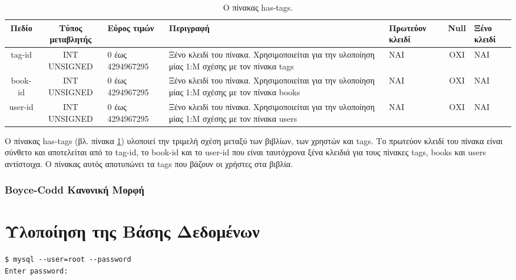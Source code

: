 \documentclass{assignment}
\begin{document}
\begin{landscape}
\begin{table}[htbp]
\begin{center}
  \begin{tabular}{|c|c|m{}|m{}|m{2.0cm}|c|m{1.5cm}|}
    \hline
    {\bf Πεδίο} & {\bf Τύπος μεταβλητής} & {\bf Εύρος τιμών} & {\bf Περιγραφή} & {\bf Πρωτεύον κλειδί} & {\bf Null} & {\bf Ξένο κλειδί} \\ \hline
    tag-id & INT UNSIGNED & 0 έως 4294967295 & Ξένο κλειδί του πίνακα. Χρησιμοποιείται για την υλοποίηση μίας 1:Μ σχέσης με τον πίνακα tags & ΝΑΙ & ΟΧΙ & NAI \\ \hline
    book-id & INT UNSIGNED & 0 έως 4294967295 & Ξένο κλειδί του πίνακα. Χρησιμοποιείται για την υλοποίηση μίας 1:Μ σχέσης με τον πίνακα books & ΝΑΙ & ΟΧΙ & NAI \\ \hline
    user-id & INT UNSIGNED & 0 έως 4294967295 & Ξένο κλειδί του πίνακα. Χρησιμοποιείται για την υλοποίηση μίας 1:Μ σχέσης με τον πίνακα users & ΝΑΙ & ΟΧΙ & NAI \\ \hline
  \end{tabular}
\caption{Ο πίνακας has-tags.}
\label{table:db_table:has-tags}
\end{center}
\end{table}

Ο πίνακας has-tags (βλ. πίνακα \ref{table:db_table:has-tags}) υλοποιεί την τριμελή σχέση μεταξύ των βιβλίων, των χρηστών και tags. Το πρωτεύον κλειδί του πίνακα είναι σύνθετο και αποτελείται από το tag-id, το book-id και το user-id που είναι ταυτόχρονα ξένα κλειδιά για τους πίνακες  tags, books και users αντίστοιχα. Ο πίνακας αυτός αποτυπώνει τα tags που βάζουν οι χρήστες στα βιβλία.
\end{landscape}

\subsubsection{Boyce-Codd Κανονική Μορφή}


\section{Υλοποίηση της Βάσης Δεδομένων}



\begin{verbatim}
$ mysql --user=root --password
Enter password: 
\end{verbatim} 

\end{document}
